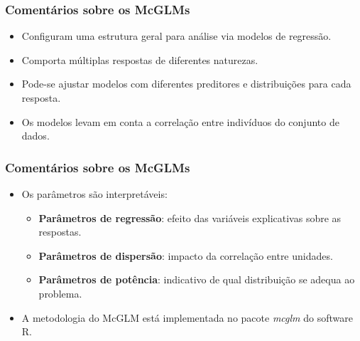 \documentclass[10pt,
  aspectratio=169,
  serif,
  mathserif,
  professionalfont,
  compress,
  handout,
  ]{beamer}\usepackage[]{graphicx}\usepackage[]{color}
\begin{document}
\begin{frame}

\frametitle{Comentários sobre os McGLMs}

\begin{itemize}
   
   \itemsep 2ex
   
  \item Configuram uma estrutura geral para análise via modelos de regressão.
  
  \item Comporta múltiplas respostas de diferentes naturezas.
  
    \item Pode-se ajustar modelos com diferentes preditores e distribuições para cada resposta.
  
  \item Os modelos levam em conta a correlação entre indivíduos do conjunto de dados. 

\end{itemize}

\end{frame}


\begin{frame}

\frametitle{Comentários sobre os McGLMs}

\begin{itemize}
   
   \itemsep 2ex
  
  \item Os parâmetros são interpretáveis:
  
    \begin{itemize}
    
    \itemsep 2ex
      
      \item \textbf{Parâmetros de regressão}: efeito das variáveis explicativas sobre as respostas.
      
      \item \textbf{Parâmetros de dispersão}: impacto da correlação entre unidades.
      
      \item \textbf{Parâmetros de potência}: indicativo de qual distribuição se adequa ao problema.
      
    \end{itemize}
    
    \item A metodologia do McGLM está implementada no pacote \emph{mcglm} \cite{mcglm} do software R.

\end{itemize}

\end{frame}
\end{document}
